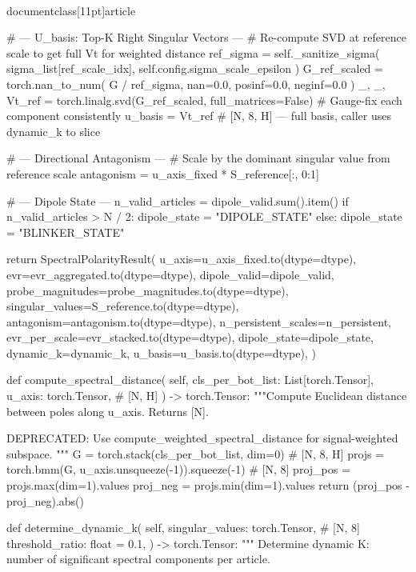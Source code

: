 \\documentclass[11pt]{article}
\begin{document}
\begin{CodeBlock}
        # --- U_basis: Top-K Right Singular Vectors ---
        # Re-compute SVD at reference scale to get full Vt for weighted distance
        ref_sigma = self._sanitize_sigma(
            sigma_list[ref_scale_idx], self.config.sigma_scale_epsilon
        )
        G_ref_scaled = torch.nan_to_num(
            G / ref_sigma, nan=0.0, posinf=0.0, neginf=0.0
        )
        _, _, Vt_ref = torch.linalg.svd(G_ref_scaled, full_matrices=False)
        # Gauge-fix each component consistently
        u_basis = Vt_ref  # [N, 8, H] — full basis, caller uses dynamic_k to slice

        # --- Directional Antagonism ---
        # Scale by the dominant singular value from reference scale
        antagonism = u_axis_fixed * S_reference[:, 0:1]

        # --- Dipole State ---
        n_valid_articles = dipole_valid.sum().item()
        if n_valid_articles > N / 2:
            dipole_state = "DIPOLE_STATE"
        else:
            dipole_state = "BLINKER_STATE"

        return SpectralPolarityResult(
            u_axis=u_axis_fixed.to(dtype=dtype),
            evr=evr_aggregated.to(dtype=dtype),
            dipole_valid=dipole_valid,
            probe_magnitudes=probe_magnitudes.to(dtype=dtype),
            singular_values=S_reference.to(dtype=dtype),
            antagonism=antagonism.to(dtype=dtype),
            n_persistent_scales=n_persistent,
            evr_per_scale=evr_stacked.to(dtype=dtype),
            dipole_state=dipole_state,
            dynamic_k=dynamic_k,
            u_basis=u_basis.to(dtype=dtype),
        )

    def compute_spectral_distance(
        self,
        cls_per_bot_list: List[torch.Tensor],
        u_axis: torch.Tensor,  # [N, H]
    ) -> torch.Tensor:
        """Compute Euclidean distance between poles along u_axis. Returns [N].

        DEPRECATED: Use compute_weighted_spectral_distance for signal-weighted subspace.
        """
        G = torch.stack(cls_per_bot_list, dim=0)  # [N, 8, H]
        projs = torch.bmm(G, u_axis.unsqueeze(-1)).squeeze(-1)  # [N, 8]
        proj_pos = projs.max(dim=1).values
        proj_neg = projs.min(dim=1).values
        return (proj_pos - proj_neg).abs()

    def determine_dynamic_k(
        self,
        singular_values: torch.Tensor,  # [N, 8]
        threshold_ratio: float = 0.1,
    ) -> torch.Tensor:
        """
        Determine dynamic K: number of significant spectral components per article.


\end{CodeBlock}
\end{document}
